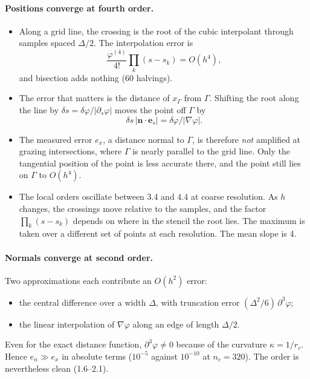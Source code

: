 \documentclass[11pt,a4paper]{article}
\begin{document}
\paragraph{Positions converge at fourth order.}
\begin{itemize}
  \item Along a grid line, the crossing is the root of the cubic interpolant through samples
    spaced $\Delta/2$. The interpolation error is
    \[
    \frac{\varphi^{(4)}}{4!}\prod_k(s-s_k)=O(h^4),
    \]
    and bisection adds nothing (60 halvings).
  \item The error that matters is the distance of $x_\Gamma$ from $\Gamma$. Shifting the root
    along the line by $\delta s=\delta\varphi/|\partial_s\varphi|$ moves the point off
    $\Gamma$ by
    \[
    \delta s\,|\mathbf n\cdot\mathbf e_s|=\delta\varphi/|\nabla\varphi|.
    \]
  \item The measured error $e_x$, a distance normal to $\Gamma$, is therefore \emph{not}
    amplified at grazing intersections,
    where $\Gamma$ is nearly parallel to the grid line. Only the tangential position of the
    point is less accurate there, and the point still lies on $\Gamma$ to $O(h^4)$.
  \item The local orders oscillate between 3.4 and 4.4 at coarse resolution. As $h$ changes,
    the crossings move relative to the samples, and the factor $\prod_k(s-s_k)$ depends on
    where in the stencil the root lies. The maximum is taken over a different set of points at
    each resolution. The mean slope is 4.
\end{itemize}

\paragraph{Normals converge at second order.}
Two approximations each contribute an $O(h^2)$ error:
\begin{itemize}
  \item the central difference over a width $\Delta$, with truncation error
    $(\Delta^2/6)\,\partial^3\varphi$;
  \item the linear interpolation of $\nabla\varphi$ along an edge of length $\Delta/2$.
\end{itemize}
Even for the exact distance function, $\partial^3\varphi\neq0$ because of the curvature
$\kappa=1/r_c$. Hence $e_n\gg e_x$ in absolute terms ($10^{-5}$ against $10^{-10}$ at
$n_c=320$). The order is nevertheless clean (1.6--2.1).
\end{document}
